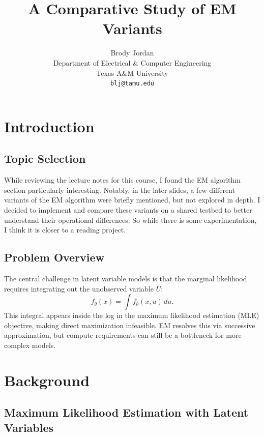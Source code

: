 \documentclass{article}
\title{A Comparative Study of EM Variants}
\author{%
  Brody Jordan \\
  Department of Electrical \& Computer Engineering \\
  Texas A\&M University \\
  \texttt{blj@tamu.edu} \\
}
\begin{document}
\maketitle
\pgfplotsset{compat=1.18}

\section{Introduction}

\subsection{Topic Selection}
While reviewing the lecture notes for this course, I found the EM algorithm section particularly interesting. Notably,
in the later slides, a few different variants of the EM algorithm were briefly mentioned, but not explored in depth. I
decided to implement and compare these variants on a shared testbed to better understand their operational
differences. So while there is
some experimentation, I think it is closer to a reading project.

\subsection{Problem Overview}
The central challenge in latent variable models is that the marginal
likelihood requires integrating out the unobserved variable $U$:
\begin{equation}
  f_\theta(x) = \int f_\theta(x, u)\, du.
  \label{eq:marginal}
\end{equation}
This integral appears inside the log in the maximum likelihood
estimation (MLE) objective, making direct maximization infeasible.
EM resolves this via successive approximation, but
compute requirements can still be a bottleneck for more complex models.

\section{Background}

\subsection{Maximum Likelihood Estimation with Latent Variables}
\end{document}
